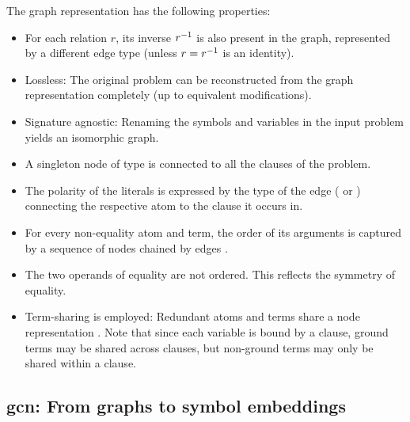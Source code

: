 The graph representation has the following properties:
\begin{itemize}
\item For each relation $r$, its inverse $r^{-1}$ is also present in the graph,
represented by a different edge type (unless $r = r^{-1}$ is an identity).
\item Lossless: The original problem can be reconstructed from the graph representation completely
(up to equivalent modifications).
\item Signature agnostic: Renaming the symbols and variables in the input problem yields an isomorphic graph.
\item A singleton node of type  is connected to all the clauses of the problem.
\item The polarity of the literals is expressed by the type of the edge (\epos{} or \eneg{})
connecting the respective atom to the clause it occurs in.
\item For every non-equality atom and term, the order of its arguments is captured by a sequence of  nodes chained by edges \cite{Rawson2020}.
\item The two operands of equality are not ordered.
This reflects the symmetry of equality.
\item Term-sharing is employed: Redundant atoms and terms share a node representation \cite{}.
Note that since each variable is bound by a clause,
ground terms may be shared across clauses,
but non-ground terms may only be shared within a clause.
\end{itemize}

\subsection{\Gls{gcn}: From graphs to symbol embeddings}

